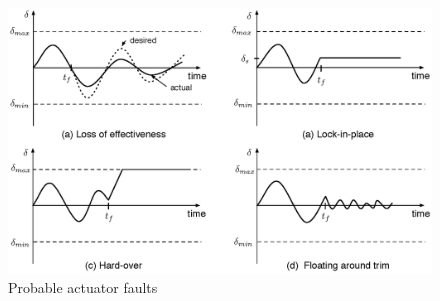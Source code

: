 \begin{figure}
\begin{center}
\includegraphics[width=13cm]{figures/actuatorFaults}    %
\caption{Probable actuator faults \cite{ducard2009fault}} 
\label{fig:actuatorFaults}
\end{center}
\end{figure}







